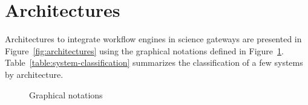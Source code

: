 \documentclass[preprint,3p,twocolumn]{elsarticle}
\begin{document}
\section{Architectures}
\label{sec:architectures}


Architectures to integrate workflow engines in science gateways are
presented in Figure~\ref{fig:architectures} using the graphical
notations defined in
Figure~\ref{fig:notations}. Table~\ref{table:system-classification}
summarizes the classification of a few systems by architecture.


\begin{figure}
\centering
\def\svgwidth{0.8\columnwidth}

\caption{Graphical notations}
\label{fig:notations}
\end{figure}
\end{document}
